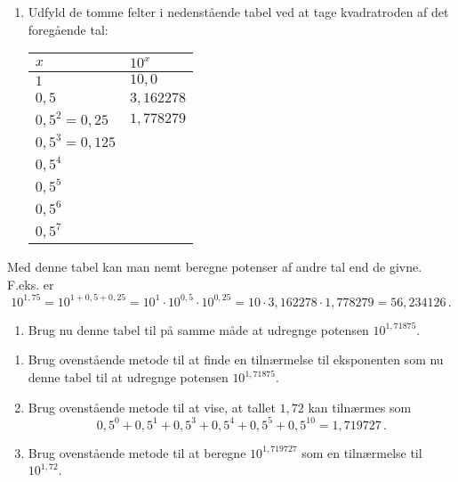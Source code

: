 \documentclass[12pt,oneside,a4paper]{article}
\theoremstyle{plain}
\begin{document}
\begin{enumerate}[label=(\alph*), resume]
    \item Udfyld de tomme felter i nedenstående tabel ved at tage kvadratroden
        af det foregående tal:
        \begin{center}
            \begin{tabular}{|l|l|}
\hline
                $x$ & $10^x$ \\
                \hline
                $1$ & $10,0$ \\
                \hline
                $0,5$ & $3,162278$ \\
                \hline
                $0,5^2 = 0,25$ & $1,778279$ \\
                \hline
                $0,5^3 = 0,125$ &  \\
                \hline
                $0,5^4$ & \\
                \hline
                $0,5^5$ & \\
                \hline
                $0,5^6$ & \\
                \hline
                $0,5^7$ & \\
                \hline
            \end{tabular}
        \end{center}
\end{enumerate}

Med denne tabel kan man nemt beregne potenser af andre tal end de givne. F.eks. er 
\[
    10^{1,75} = 10^{1+0,5+0,25} = 10^1 \cdot 10^{0,5} \cdot 10^{0,25}
    = 10 \cdot 3,162278 \cdot 1,778279 = 56,234126 \,.
\]

\begin{enumerate}[label=(\alph*), resume]
    \item Brug nu denne tabel til på samme måde at udregnge potensen $10^{1,71875}$.
\end{enumerate}

\begin{enumerate}[label=(\alph*), resume]
    \item Brug ovenstående metode til at finde en tilnærmelse til eksponenten som nu denne tabel til at udregnge potensen $10^{1,71875}$.
    \item Brug ovenstående metode til at vise, at tallet $1,72$ kan tilnærmes som
        \[
            0,5^0 + 0,5^1 + 0,5^3 + 0,5^4 + 0,5^5 + 0,5^{10} = 1,719727 \,.
        \]
\item Brug ovenstående metode til at beregne $10^{1,719727}$ som en
        tilnærmelse til $10^{1,72}$.
\end{enumerate}
\end{document}
